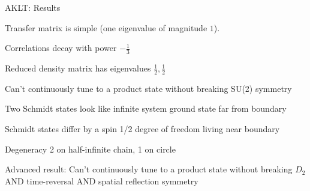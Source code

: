 \begin{frame}{AKLT: Results}
\bi 
\item Transfer matrix is simple (one eigenvalue of magnitude $1$).
\item Correlations decay with power $-\frac{1}{3}$
\item Reduced density matrix has eigenvalues $\frac12, \frac12$
\item Can't continuously tune to a product state without breaking SU(2) symmetry
\item Two Schmidt states look like infinite system ground state far from boundary
\item Schmidt states differ by a spin 1/2 degree of freedom living near boundary
\item Degeneracy 2 on half-infinite chain, 1 on circle
\item Advanced result: Can't continuously tune to a product state without breaking $D_2$ AND time-reversal AND spatial reflection symmetry
\ei 
\end{frame}
